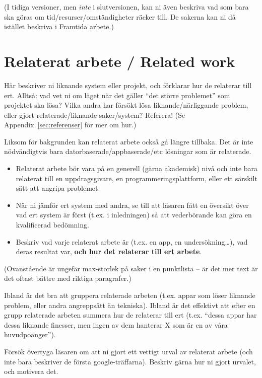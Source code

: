 \documentclass[a4paper,12pt]{article}
\begin{document}
(I tidiga versioner, men \emph{inte} i slutversionen, kan ni även beskriva vad som bara ska göras om tid/resurser/omständigheter räcker till. De sakerna kan ni då istället beskriva i Framtida arbete.)

\section{Relaterat arbete / Related work}
Här beskriver ni liknande system eller projekt, och förklarar hur de relaterar till ert.  Alltså: vad vet ni om läget när det gäller ``det större problemet'' som projektet ska lösa?  Vilka andra har försökt lösa liknande/närliggande problem, eller gjort relaterade/liknande saker/system? Referera! (Se Appendix~\ref{sec:referenser} för mer om hur.)

Liksom för bakgrunden kan relaterat arbete också gå längre tillbaka. Det är inte nödvändigtvis bara datorbaserade/appbaserade/etc lösningar som är relaterade.

\begin{itemize}
\item 
  Relaterat arbete bör vara på en generell (gärna akademisk) nivå och inte bara relaterat till en uppdragsgivare, en programmeringsplattform, eller ett särskilt sätt att angripa problemet.
\item 
  När ni jämför ert system med andra, se till att läsaren fått en översikt över vad ert system är först (t.ex. i inledningen) så att vederbörande kan göra en kvalificerad bedömning.
\item
 Beskriv vad varje relaterat arbete är (t.ex. en app, en undersökning\ldots), vad deras resultat var, \textbf{och hur det relaterar till ert arbete}.
\end{itemize}

(Ovanstående är ungefär max-storlek på saker i en punktlista -- är det mer text är det oftast bättre med riktiga paragrafer.)

Ibland är det bra att gruppera relaterade arbeten (t.ex. appar som löser liknande problem, eller andra angreppsätt än tekniska).
Ibland är det effektivt att efter en grupp relaterade arbeten summera hur de relaterar till ert (t.ex. ``dessa appar har dessa liknande finesser, men ingen av dem hanterar X som är en av våra huvudpoänger'').

Försök övertyga läsaren om att ni gjort ett vettigt urval av relaterat arbete (och inte bara beskriver de första google-träffarna). Beskriv gärna hur ni gjort urvalet, och motivera det.
\end{document}
